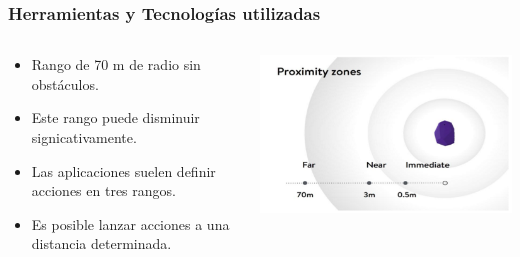 \begin{frame}
	\frametitle{Herramientas y Tecnologías utilizadas}
	\begin{columns}
			\begin{column}{0.6\textwidth}
					\begin{itemize}
						\item {Rango de 70 m de radio sin obstáculos.}
						\item {Este rango puede disminuir signicativamente.}
						\item {Las aplicaciones suelen definir acciones en tres rangos.}
						\item {Es posible lanzar acciones a una distancia determinada.}
					\end{itemize}
				\endblock{}
			\end{column}
			\begin{column}{0.4\textwidth}
				\vfill 
					\begin{center}
						\includegraphics[width=0.9\linewidth]{Images/beaconsRange}
					\end{center}
			\end{column}
	\end{columns}
\end{frame}


